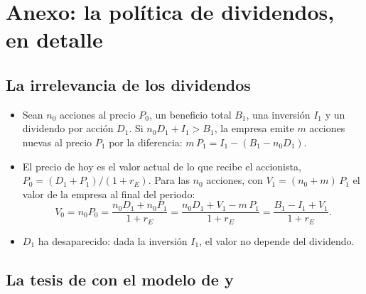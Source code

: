 \documentclass[11pt]{article}
\begin{document}
\section{Anexo: la política de dividendos, en detalle}\label{anexo:walter}

\subsection{La irrelevancia de los dividendos}\label{anexo:irrelevancia-dividendos}

\begin{itemize}
\item Sean $n_0$ acciones al precio $P_0$, un beneficio total $B_1$, una inversión $I_1$ y un dividendo por acción $D_1$. Si $n_0D_1+I_1>B_1$, la empresa emite $m$ acciones nuevas al precio $P_1$ por la diferencia: $m\,P_1=I_1-(B_1-n_0D_1)$.
\item El precio de hoy es el valor actual de lo que recibe el accionista, $P_0=(D_1+P_1)/(1+r_E)$. Para las $n_0$ acciones, con $V_1=(n_0+m)\,P_1$ el valor de la empresa al final del periodo:
  \[
  V_0=n_0P_0=\frac{n_0D_1+n_0P_1}{1+r_E}=\frac{n_0D_1+V_1-m\,P_1}{1+r_E}=\frac{B_1-I_1+V_1}{1+r_E}.
  \]
\item $D_1$ ha desaparecido: dada la inversión $I_1$, el valor no depende del dividendo\nocite{MillerModigliani1961Dividend}.\findemo
\end{itemize}

\subsection{La tesis de  con el modelo de  y }\label{anexo:walter-gordon}
\end{document}

